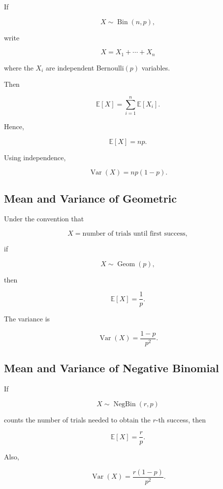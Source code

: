 If

\[
X\sim\operatorname{Bin}(n,p),
\]

write

\[
X
=
X_1+\cdots+X_n
\]

where the \(X_i\) are independent Bernoulli\((p)\) variables.

Then

\[
\mathbb{E}[X]
=
\sum_{i=1}^{n}
\mathbb{E}[X_i].
\]

Hence,

\[
\boxed{
\mathbb{E}[X]=np.
}
\]

Using independence,

\[
\boxed{
\operatorname{Var}(X)
=
np(1-p).
}
\]

\subsection{Mean and Variance of Geometric}
\label{subsec:geometric-mean-variance}

Under the convention that

\[
X
=
\text{number of trials until first success},
\]

if

\[
X\sim\operatorname{Geom}(p),
\]

then

\[
\boxed{
\mathbb{E}[X]
=
\frac1p.
}
\]

The variance is

\[
\boxed{
\operatorname{Var}(X)
=
\frac{1-p}{p^2}.
}
\]

\subsection{Mean and Variance of Negative Binomial}
\label{subsec:negative-binomial-mean-variance}

If

\[
X
\sim
\operatorname{NegBin}(r,p)
\]

counts the number of trials needed to obtain the \(r\)-th success, then

\[
\boxed{
\mathbb{E}[X]
=
\frac{r}{p}.
}
\]

Also,

\[
\boxed{
\operatorname{Var}(X)
=
\frac{r(1-p)}{p^2}.
}
\]

